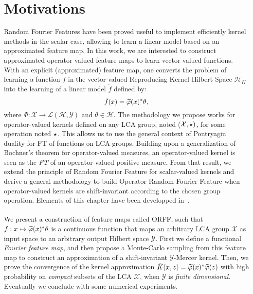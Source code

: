 
\section{Motivations}
\label{sec:motivations}
Random Fourier Features have been proved useful to implement efficiently kernel
methods in the scalar case, allowing to learn a linear model based on an
approximated feature map. In this work, we are interested to construct
approximated operator-valued feature maps to learn vector-valued functions.
With an explicit (approximated) feature map, one converts the problem of
learning a function $f$ in the vector-valued Reproducing Kernel Hilbert Space
$\mathcal{H}_K$ into the learning of a linear model $\tilde{f}$ defined by:
\begin{dmath*}
    \tilde{f}(x) = \tildePhi{\omega}(x)^\adjoint \theta,
\end{dmath*}
where $\Phi: \mathcal{X} \to \mathcal{L}(\mathcal{H},\mathcal{Y})$ and $\theta
\in \mathcal{H}$. The methodology we propose works for operator-valued kernels
defined on any \acf{LCA} group, noted ($\mathcal{X}, \star)$, for some
operation noted $\star$. This allows us to use the general context of
Pontryagin duality for \acl{FT} of functions on \acs{LCA} groups. Building upon
a generalization of Bochner's theorem for operator-valued measures, an
operator-valued kernel is seen as the \emph{\acl{FT}} of an operator-valued
positive measure. From that result, we extend the principle of Random Fourier
Feature for scalar-valued kernels and derive a general methodology to build
Operator Random Fourier Feature when operator-valued kernels are
shift-invariant according to the chosen group operation. Elements of this
chapter have been developped in~\citet{brault2016random}.
\paragraph{}
We present a construction of feature maps called \acf{ORFF}, such that $f:
x\mapsto \tildePhi{\omega}(x)^\adjoint \theta$ is a continuous function that
maps an arbitrary \acs{LCA} group $\mathcal{X}$ as input space to an arbitrary
output Hilbert space $\mathcal{Y}$. First we define a functional \emph{Fourier
feature map}, and then propose a Monte-Carlo sampling from this feature map to
construct an approximation of a shift-invariant $\mathcal{Y}$-Mercer kernel.
Then, we prove the convergence of the kernel approximation
$\tilde{K}(x,z)=\tildePhi{\omega}(x)^\adjoint \tildePhi{\omega}(z)$ with high
probability on \emph{compact} subsets of the \acs{LCA} $\mathcal{X}$, when
$\mathcal{Y}$ is \emph{finite dimensional}. Eventually we conclude with some
numerical experiments.

